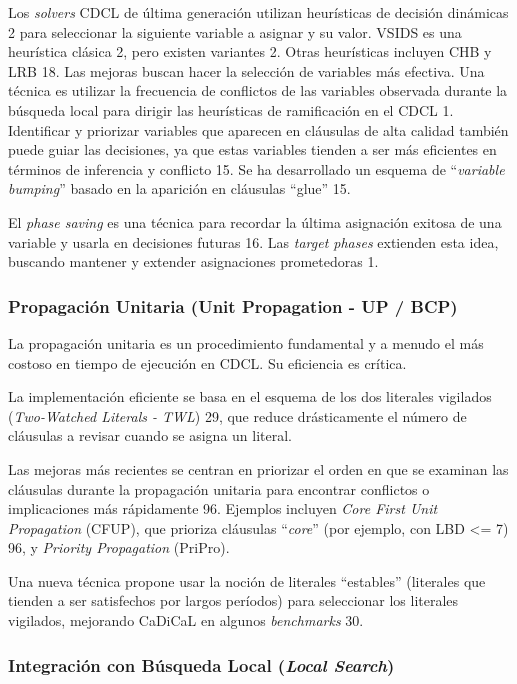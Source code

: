 Los \textit{solvers} CDCL de última generación utilizan heurísticas de decisión dinámicas 2 para seleccionar la siguiente variable a asignar y su valor. VSIDS es una heurística clásica 2, pero existen variantes 2. Otras heurísticas incluyen CHB y LRB 18.
Las mejoras buscan hacer la selección de variables más efectiva. Una técnica es utilizar la frecuencia de conflictos de las variables observada durante la búsqueda local para dirigir las heurísticas de ramificación en el CDCL 1.
Identificar y priorizar variables que aparecen en cláusulas de alta calidad también puede guiar las decisiones, ya que estas variables tienden a ser más eficientes en términos de inferencia y conflicto 15. Se ha desarrollado un esquema de ``\textit{variable bumping}'' basado en la aparición en cláusulas ``glue'' 15.

El \textit{phase saving} es una técnica para recordar la última asignación exitosa de una variable y usarla en decisiones futuras 16. Las \textit{target phases} extienden esta idea, buscando mantener y extender asignaciones prometedoras 1.

\subsubsection{Propagación Unitaria (Unit Propagation - UP / BCP)}

La propagación unitaria es un procedimiento fundamental y a menudo el más costoso en tiempo de ejecución en CDCL. Su eficiencia es crítica.

La implementación eficiente se basa en el esquema de los dos literales vigilados (\textit{Two-Watched Literals - TWL}) 29, que reduce drásticamente el número de cláusulas a revisar cuando se asigna un literal.

Las mejoras más recientes se centran en priorizar el orden en que se examinan las cláusulas durante la propagación unitaria para encontrar conflictos o implicaciones más rápidamente 96. Ejemplos incluyen \textit{Core First Unit Propagation} (CFUP), que prioriza cláusulas ``\textit{core}'' (por ejemplo, con LBD <= 7) 96, y \textit{Priority Propagation} (PriPro).

Una nueva técnica propone usar la noción de literales ``estables'' (literales que tienden a ser satisfechos por largos períodos) para seleccionar los literales vigilados, mejorando CaDiCaL en algunos \textit{benchmarks} 30.

\subsubsection{Integración con Búsqueda Local (\textit{Local Search})}

